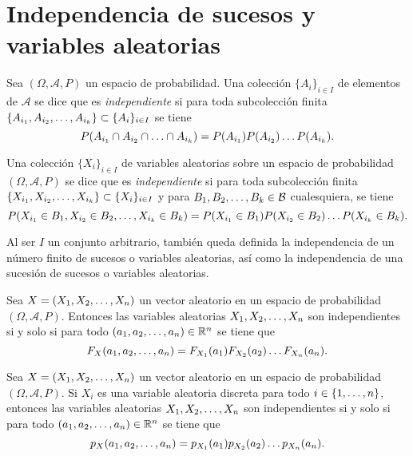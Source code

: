 \documentclass[a4paper, 11pt, extrafontsizes]{memoir}
\begin{document}
\section{Independencia de sucesos y variables aleatorias}

\begin{definition}
    Sea $(\Omega,\mathcal{A},P)$ un espacio de probabilidad. Una colección $\{A_i\}_{i \in I}$ de elementos de $\mathcal{A}$ se dice que es \emph{independiente} si para toda subcolección finita $\{A_{i_1}, A_{i_2}, \mathellipsis, A_{i_k}\} \subset \{A_i\}_{i \in I}$ se tiene
    \[P(A_{i_1} \cap A_{i_2} \cap \mathellipsis \cap A_{i_k}) = P(A_{i_1})P(A_{i_2})\mathellipsis P(A_{i_k}).\]
\end{definition}

\begin{definition}
    Una colección $\{X_i\}_{i \in I}$ de variables aleatorias sobre un espacio de probabilidad $(\Omega,\mathcal{A},P)$ se dice que es \emph{independiente} si para toda subcolección finita $\{X_{i_1}, X_{i_2}, \mathellipsis, X_{i_k}\} \subset \{X_i\}_{i \in I}$ y para $B_1,B_2,\mathellipsis,B_k \in \mathcal{B}$ cualesquiera, se tiene
    \[P(X_{i_1} \in B_1, X_{i_2} \in B_2, \mathellipsis, X_{i_k} \in B_k) = P(X_{i_1} \in B_1)P(X_{i_2} \in B_2)\mathellipsis P(X_{i_k} \in B_k).\]
\end{definition}

Al ser $I$ un conjunto arbitrario, también queda definida la independencia de un número finito de sucesos o variables aleatorias, así como la independencia de una sucesión de sucesos o variables aleatorias.

\begin{proposition}
    Sea $X = (X_1,X_2,\mathellipsis,X_n)$ un vector aleatorio en un espacio de probabilidad $(\Omega,\mathcal{A},P)$. Entonces las variables aleatorias $X_1,X_2,\mathellipsis,X_n$ son independientes si y solo si para todo $(a_1,a_2,\mathellipsis,a_n) \in \mathbb R^n$ se tiene que
    \[F_X(a_1,a_2,\mathellipsis,a_n) = F_{X_1}(a_1)F_{X_2}(a_2)\mathellipsis F_{X_n}(a_n).\]
    
\end{proposition}

\begin{proposition}
    Sea $X = (X_1,X_2,\mathellipsis,X_n)$ un vector aleatorio en un espacio de probabilidad $(\Omega,\mathcal{A},P)$. Si $X_i$ es una variable aleatoria discreta para todo $i \in \{1,\mathellipsis,n\}$, entonces las variables aleatorias $X_1,X_2,\mathellipsis,X_n$ son independientes si y solo si
    para todo $(a_1,a_2,\mathellipsis,a_n) \in \mathbb R^n$ se tiene que
    \[p_X(a_1,a_2,\mathellipsis,a_n) = p_{X_1}(a_1)p_{X_2}(a_2)\mathellipsis p_{X_n}(a_n).\]
    
\end{proposition}
\end{document}
